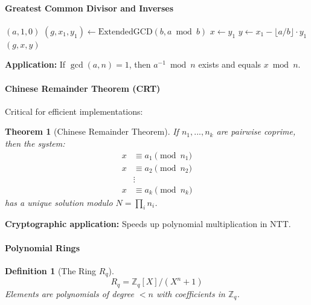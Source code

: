 \documentclass[11pt,a4paper]{article}
\newtheorem{definition}{Definition}
\newtheorem{theorem}{Theorem}
\begin{document}
\paragraph{Greatest Common Divisor and Inverses}

\begin{algorithm}
\caption{Extended Euclidean Algorithm}
\begin{algorithmic}[1]
        \State \Return $(a, 1, 0)$ 
    \EndIf
    \State $(g, x_1, y_1) \gets \text{ExtendedGCD}(b, a \bmod b)$
    \State $x \gets y_1$
    \State $y \gets x_1 - \lfloor a/b \rfloor \cdot y_1$
    \State \Return $(g, x, y)$ 
\EndFunction
\end{algorithmic}
\end{algorithm}

\textbf{Application:} If $\gcd(a, n) = 1$, then $a^{-1} \bmod n$ exists and equals $x \bmod n$.

\paragraph{Chinese Remainder Theorem (CRT)}

Critical for efficient implementations:

\begin{theorem}[Chinese Remainder Theorem]
If $n_1, ..., n_k$ are pairwise coprime, then the system:
\begin{align}
x &\equiv a_1 \pmod{n_1}\\
x &\equiv a_2 \pmod{n_2}\\
&\vdots\\
x &\equiv a_k \pmod{n_k}
\end{align}
has a unique solution modulo $N = \prod_i n_i$.
\end{theorem}

\textbf{Cryptographic application:} Speeds up polynomial multiplication in NTT.

\paragraph{Polynomial Rings}

\begin{definition}[The Ring $R_q$]
$$R_q = \mathbb{Z}_q[X]/(X^n + 1)$$
Elements are polynomials of degree $< n$ with coefficients in $\mathbb{Z}_q$.
\end{definition}
\end{document}
